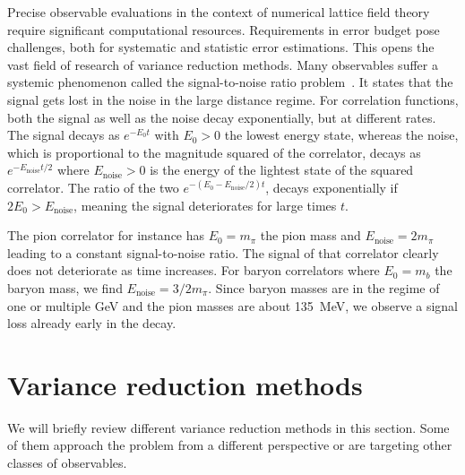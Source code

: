 Precise observable evaluations in the context of numerical lattice field theory require significant computational resources.
Requirements in error budget pose challenges, both for systematic and statistic error estimations.
This opens the vast field of research of variance reduction methods.
Many observables suffer a systemic phenomenon called the signal-to-noise ratio problem~\cite{parisi1984,lepage1989}.
It states that the signal gets lost in the noise in the large distance regime.
For correlation functions, both the signal as well as the noise decay exponentially, but at different rates.
The signal decays as $e^{-E_0 t}$ with $E_0 > 0$ the lowest energy state, whereas the noise, which is proportional to the magnitude squared of the correlator, decays as $e^{-E_{\text{noise}}t/2}$ where $E_{\text{noise}} > 0$ is the energy of the lightest state of the squared correlator.
The ratio of the two $e^{-(E_0 - E_{\text{noise}}/2)t}$, decays exponentially if $2E_0 > E_{\text{noise}}$, meaning the signal deteriorates for large times $t$.

The pion correlator for instance has $E_0 = m_{\pi}$ the pion mass and $E_{\text{noise}} = 2 m_{\pi}$ leading to a constant signal-to-noise ratio.
The signal of that correlator clearly does not deteriorate as time increases.
For baryon correlators where $E_0 = m_{b}$ the baryon mass, we find $E_{\text{noise}} = 3/2 m_{\pi}$.
Since baryon masses are in the regime of one or multiple GeV and the pion masses are about \SI{135}{\mega \eV}, we observe a signal loss already early in the decay.

\section{Variance reduction methods}

We will briefly review different variance reduction methods in this section.
Some of them approach the problem from a different perspective or are targeting other classes of observables.

